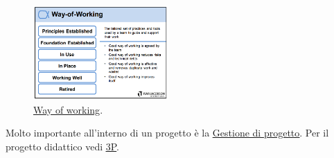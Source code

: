 		\begin{figure}[H]
			\centering
			\qquad
		\end{figure} 
	
		\begin{figure}[H]
			\centering
			\includegraphics[width=0.46\textwidth]{img/cards/way}		
			\caption{\underline{\hyperref[way]{Way of working}}.}
		\end{figure} 
			
		Molto importante all'interno di un progetto è la \underline{\hyperref[gestioneprogetto]{Gestione di progetto}}. Per il progetto didattico vedi \underline{\hyperref[3p]{3P}}.
			
		
